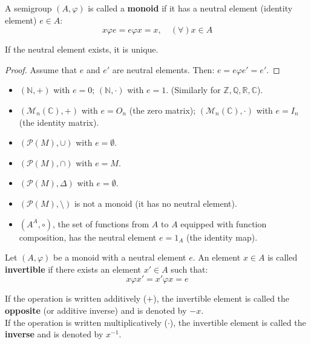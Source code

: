 \begin{definition}
A semigroup $(A, \varphi)$ is called a \textbf{monoid} if it has a neutral element (identity element) $e \in A$:
$$ x \varphi e = e \varphi x = x, \quad (\forall) x \in A $$
\end{definition}

\begin{remark}
If the neutral element exists, it is unique.
\end{remark}

\begin{proof}
Assume that $e$ and $e'$ are neutral elements. Then: $e = e \varphi e' = e'$.
\end{proof}

\begin{example}\leavevmode
\begin{itemize}
    \item $(\mathbb{N}, +)$ with $e = 0$; $(\mathbb{N}, \cdot)$ with $e = 1$. (Similarly for $\mathbb{Z}, \mathbb{Q}, \mathbb{R}, \mathbb{C}$).
    \item $(\mathcal{M}_n(\mathbb{C}), +)$ with $e = O_n$ (the zero matrix); $(\mathcal{M}_n(\mathbb{C}), \cdot)$ with $e = I_n$ (the identity matrix).
    \item $(\mathcal{P}(M), \cup)$ with $e = \emptyset$.
    \item $(\mathcal{P}(M), \cap)$ with $e = M$.
    \item $(\mathcal{P}(M), \Delta)$ with $e = \emptyset$.
    \item $(\mathcal{P}(M), \setminus)$ is not a monoid (it has no neutral element).
    \item $(A^A, \circ)$, the set of functions from $A$ to $A$ equipped with function composition, has the neutral element $e = 1_A$ (the identity map).
\end{itemize}
\end{example}

\begin{definition}
Let $(A, \varphi)$ be a monoid with a neutral element $e$. An element $x \in A$ is called \textbf{invertible} if there exists an element $x' \in A$ such that:
$$ x \varphi x' = x' \varphi x = e $$
\end{definition}

\begin{remark}
If the operation is written additively ($+$), the invertible element is called the \textbf{opposite} (or additive inverse) and is denoted by $-x$. \\
If the operation is written multiplicatively ($\cdot$), the invertible element is called the \textbf{inverse} and is denoted by $x^{-1}$.
\end{remark}

